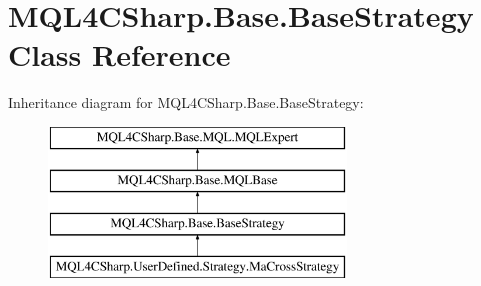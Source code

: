 \hypertarget{class_m_q_l4_c_sharp_1_1_base_1_1_base_strategy}{}\section{M\+Q\+L4\+C\+Sharp.\+Base.\+Base\+Strategy Class Reference}
\label{class_m_q_l4_c_sharp_1_1_base_1_1_base_strategy}
Inheritance diagram for M\+Q\+L4\+C\+Sharp.\+Base.\+Base\+Strategy\+:\begin{figure}[H]
\begin{center}
\leavevmode
\includegraphics[height=4.000000cm]{class_m_q_l4_c_sharp_1_1_base_1_1_base_strategy}
\end{center}
\end{figure}

